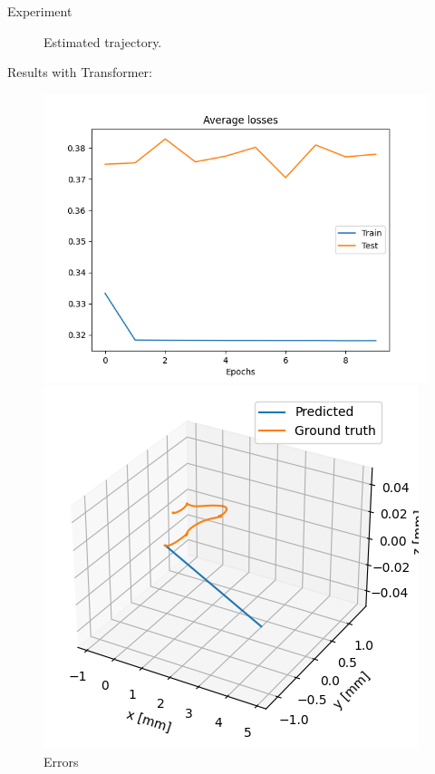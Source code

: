 \documentclass[aspectratio=169,t,xcolor=table]{beamer}
\begin{document}
\begin{frame}[allowframebreaks]{Experiment}
\begin{figure}[!htb]
\begin{center}
\begin{minipage}{0.45\textwidth}
            \caption{Estimated trajectory.}\label{graph2}
        \end{minipage}
    \end{center}
\end{figure}
Results with Transformer:
\begin{figure}[!htb]
    \begin{center}
        \begin{minipage}{0.45\textwidth}
            \centering
            \includegraphics[width=\linewidth]{../outputs/transformerError.png}
            \caption{Errors}\label{graph3}
        \end{minipage}
        \hfill
        \begin{minipage}{0.45\textwidth}
            \centering
            \includegraphics[width=\linewidth]{../outputs/transformerTrajectory.png}

\end{minipage}
\end{center}
\end{figure}
\end{frame}
\end{document}
